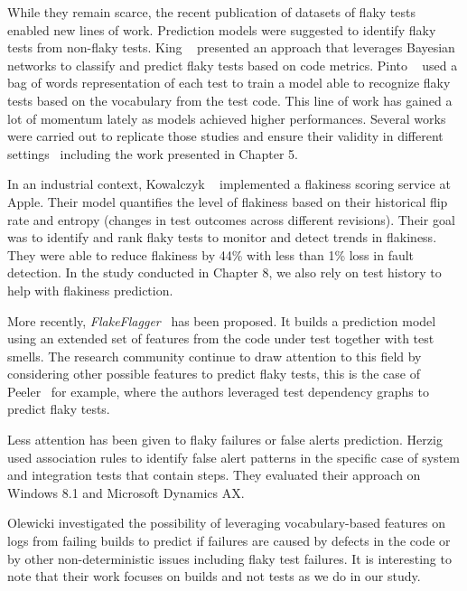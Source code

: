 While they remain scarce, the recent publication of datasets of flaky tests~\cite{Bell2018,Lam2019iDFlakies,Gruber2021} enabled new lines of work. Prediction models were suggested to identify flaky tests from non-flaky tests. King \etal~\cite{King2018} presented an approach that leverages Bayesian networks to classify and predict flaky tests based on code metrics. Pinto \etal~\cite{Pinto2020} used a bag of words representation of each test to train a model able to recognize flaky tests based on the vocabulary from the test code. This line of work has gained a lot of momentum lately as models achieved higher performances. Several works were carried out to replicate those studies and ensure their validity in different settings~\cite{Camara2021VocabExtendedReplication} including the work presented in Chapter 5.

In an industrial context, Kowalczyk \etal~\cite{Kowalczyk2020} implemented a flakiness scoring service at Apple. Their model quantifies the level of flakiness based on their historical flip rate and entropy (\ie changes in test outcomes across different revisions). Their goal was to identify and rank flaky tests to monitor and detect trends in flakiness. They were able to reduce flakiness by 44\% with less than 1\% loss in fault detection. In the study conducted in Chapter 8, we also rely on test history to help with flakiness prediction.

More recently, \textit{FlakeFlagger}~\cite{FlakeFlagger} has been proposed. It builds a prediction model using an extended set of features from the code under test together with test smells. The research community continue to draw attention to this field by considering other possible features to predict flaky tests, this is the case of Peeler~\cite{qin2022peeler} for example, where the authors leveraged test dependency graphs to predict flaky tests.

Less attention has been given to flaky failures or false alerts prediction. Herzig \etal~\cite{Herzig2015} used association rules to identify false alert patterns in the specific case of system and integration tests that contain steps. They evaluated their approach on Windows 8.1 and Microsoft Dynamics AX.

Olewicki \etal investigated the possibility of leveraging vocabulary-based features on logs from failing builds to predict if failures are caused by defects in the code or by other non-deterministic issues including flaky test failures. It is interesting to note that their work focuses on builds and not tests as we do in our study.

